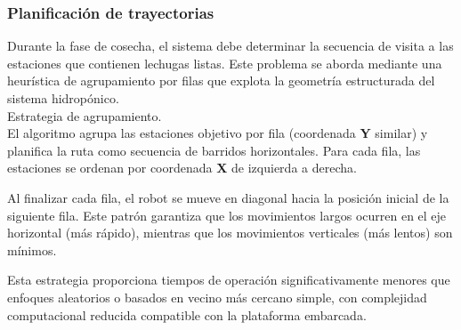 \subsubsection{Planificación de trayectorias}

Durante la fase de cosecha, el sistema debe determinar la secuencia de visita a las estaciones que contienen lechugas listas. Este problema se aborda mediante una heurística de agrupamiento por filas que explota la geometría estructurada del sistema hidropónico.\\

Estrategia de agrupamiento.\\
El algoritmo agrupa las estaciones objetivo por fila (coordenada \textbf{Y} similar) y planifica la ruta como secuencia de barridos horizontales. Para cada fila, las estaciones se ordenan por coordenada \textbf{X} de izquierda a derecha.

Al finalizar cada fila, el robot se mueve en diagonal hacia la posición inicial de la siguiente fila. Este patrón garantiza que los movimientos largos ocurren en el eje horizontal (más rápido), mientras que los movimientos verticales (más lentos) son mínimos.

Esta estrategia proporciona tiempos de operación significativamente menores que enfoques aleatorios o basados en vecino más cercano simple, con complejidad computacional reducida compatible con la plataforma embarcada.
